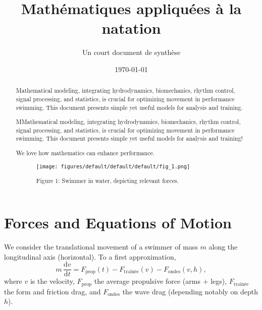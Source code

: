 \documentclass[12pt,a4paper]{article}
\title{\textbf{Mathématiques appliquées à la natation}}
\author{Un court document de synthèse}
\date{\today}
\newcommand{\dd}{\mathrm{d}}
\begin{document}
\begin{abstract}
Mathematical modeling, integrating hydrodynamics, biomechanics, rhythm control, signal processing, and statistics, is crucial for optimizing movement in performance swimming. This document presents simple yet useful models for analysis and %
training.

MMathematical modeling, integrating hydrodynamics, biomechanics, rhythm control, signal processing, and statistics, is crucial for optimizing movement in performance swimming. This document presents simple yet useful models for analysis and training!

We love  how mathematics can enhance performance.


\begin{figure}[h!]
    \centering
    \texttt{[image: figures/default/default/default/fig\_1.png]}
    \caption{%
Figure 1: Swimmer in water, depicting relevant forces.}
    \label{fig:default_default_1}
\end{figure}



\end{abstract}

\section{%
Forces and Equations of Motion}
We consider the translational movement of a swimmer of mass $m$ along the longitudinal axis (horizontal). %
To a first approximation,
\begin{equation}
 m\,\frac{\dd v}{\dd t} = F_{\mathrm{prop}}(t) - F_{\mathrm{traînée}}(v) - F_{\mathrm{ondes}}(v,h),
 \label{eq:newton}
\end{equation}
where $v$ is the velocity, $F_{\mathrm{prop}}$ the average propulsive force (arms + legs), $F_{\mathrm{traînée}}$ the form and friction drag, and $F_{\mathrm{ondes}}$ the wave drag (depending notably on depth $h$).
\end{document}
